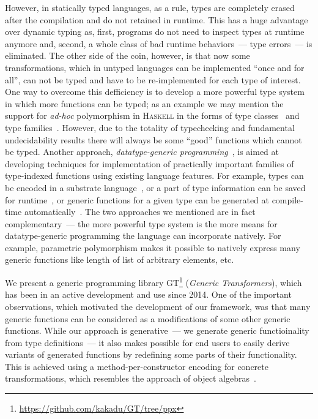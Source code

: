 However, in statically typed languages, as a rule, types are completely erased after the compilation and do not retained in runtime. This has a huge advantage over
dynamic typing as, first, programs do not need to inspect types at runtime anymore and, second, a whole class of bad runtime behaviors~--- type errors~---
is eliminated. The other side of the coin, however, is that now some transformations, which in untyped languages can be implemented ``once and for all'',
can not be typed and have to be re-implemented for each type of interest. One way to overcome this defficiency is to develop a more powerful type system in
which more functions can be typed; as an example we may mention the support for \emph{ad-hoc} polymorphism in \textsc{Haskell} in the forms of type
classes~\cite{TypeClasses} and type families~\cite{TypeFamilies}. However, due to the totality of typechecking and fundamental undecidability results there
will always be some ``good'' functions which cannot be typed. Another approach, \emph{datatype-generic programming}~\cite{DGP}, is aimed at developing techniques for
implementation of practically important families of type-indexed functions using existing language features. For example, types can be encoded in a substrate
language~\cite{Hinze,InstantGenerics,GenericOCaml}, or a part of type information can be saved for runtime~\cite{SYB,SYBOCaml}, or generic functions for a given
type can be generated at compile-time automatically~\cite{Yallop,PPXLib}. The two approaches we mentioned are in fact complementary~--- the more powerful
type system is the more means for datatype-generic programming the language can incorporate natively. For example, parametric polymorphism makes it possible
to natively express many generic functions like length of list of arbitrary elements, etc.

We present a generic programming library \textsc{GT}\footnote{\url{https://github.com/kakadu/GT/tree/ppx}} (\emph{Generic Transformers}), which has been in an
active development and use since 2014. One of the important observations, which motivated the development of our framework, was that many generic functions
can be considered as a modifications of some other generic functions. While our approach is generative~--- we generate generic functioinality from type definitions~---
it also makes possible for end users to easily derive variants of generated functions by redefining some parts of their functionality. This is achieved using
a method-per-constructor encoding for concrete transformations, which resembles the approach of object algebras~\cite{ObjectAlgebras}.

